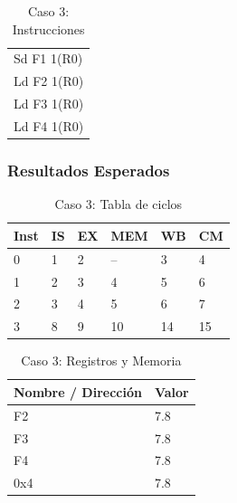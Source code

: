 \documentclass[a4paper]{article}
\begin{document}
	\begin{table}[H]
		\centering
		\caption*{Caso 3: Instrucciones}
		\begin{tabular}{l}
			Sd F1 1(R0) \\
			Ld F2 1(R0) \\
			Ld F3 1(R0) \\
			Ld F4 1(R0)
		\end{tabular}
	\end{table}

	\subsubsection*{Resultados Esperados}

	\begin{table}[H]
		\centering
		\caption*{Caso 3: Tabla de ciclos}
		\begin{tabular}{|l|l|l|l|l|l|}
			\hline
			\textbf{Inst} & \textbf{IS} & \textbf{EX} & \textbf{MEM} & \textbf{WB} & \textbf{CM} \\ \hline
			0             & 1           & 2           & --           & 3           & 4           \\ \hline
			1             & 2           & 3           & 4            & 5           & 6           \\ \hline
			2             & 3           & 4           & 5            & 6           & 7           \\ \hline
			3             & 8           & 9           & 10           & 14          & 15          \\ \hline
			\end{tabular}
	\end{table}

	\begin{table}[H]
		\centering
		\caption*{Caso 3: Registros y Memoria}
		\begin{tabular}{|l|l|}
			\hline
			\textbf{Nombre / Dirección} & \textbf{Valor} \\ \hline
			F2                          & 7.8            \\ \hline
			F3                          & 7.8            \\ \hline
			F4                          & 7.8            \\ \hline
			0x4                         & 7.8            \\ \hline
		\end{tabular}
	\end{table}
\end{document}
